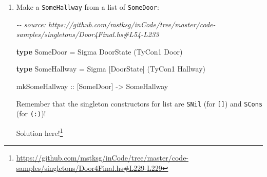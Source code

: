 \documentclass[]{article}
\newenvironment{Shaded}{}{}
\newcommand{\CommentTok}[1]{\textcolor[rgb]{0.38,0.63,0.69}{\textit{#1}}}
\newcommand{\DataTypeTok}[1]{\textcolor[rgb]{0.56,0.13,0.00}{#1}}
\newcommand{\FunctionTok}[1]{\textcolor[rgb]{0.02,0.16,0.49}{#1}}
\newcommand{\KeywordTok}[1]{\textcolor[rgb]{0.00,0.44,0.13}{\textbf{#1}}}
\newcommand{\NormalTok}[1]{#1}
\newcommand{\OperatorTok}[1]{\textcolor[rgb]{0.40,0.40,0.40}{#1}}
\newcommand{\OtherTok}[1]{\textcolor[rgb]{0.00,0.44,0.13}{#1}}
\renewcommand{\href}[2]{#2\footnote{\url{#1}}}
\begin{document}
\begin{enumerate}
\begin{Shaded}
\begin{Highlighting}[]
\FunctionTok{map}\OtherTok{ ::}\NormalTok{ (a }\OtherTok{{-}>}\NormalTok{ b) }\OtherTok{{-}>}\NormalTok{ [a] \_}\OperatorTok{>}\NormalTok{ [b]}
\FunctionTok{map}\NormalTok{ f }\OtherTok{=} \FunctionTok{foldr}\NormalTok{ ((}\OperatorTok{:}\NormalTok{) }\OperatorTok{.}\NormalTok{ f) []}
\end{Highlighting}
\end{Shaded}

  Let's do the same thing at the type level, manually.

  Directly implement a type-level \texttt{Map}, with kind
  \texttt{(j\ \textasciitilde{}\textgreater{}\ k)\ -\textgreater{}\ {[}j{]}\ -\textgreater{}\ {[}k{]}},
  in terms of \texttt{Foldr}:

\begin{Shaded}
\begin{Highlighting}[]
\KeywordTok{type} \DataTypeTok{Map}\NormalTok{ f xs }\OtherTok{=} \DataTypeTok{Foldr} \OperatorTok{????} \OperatorTok{????}\NormalTok{ xs}
\end{Highlighting}
\end{Shaded}

  Try to mirror the value-level definition, passing in \texttt{(:)\ .\ f}, and
  use the promoted version of \texttt{(.)} from the \emph{singletons} library,
  in
  \emph{\href{http://hackage.haskell.org/package/singletons-2.5/docs/Data-Singletons-Prelude.html}{Data.Singletons.Prelude}}.
  You might find \texttt{TyCon2} helpful!

  \href{https://github.com/mstksg/inCode/tree/master/code-samples/singletons/Door4Final.hs\#L229-L229}{Solution
  here!}
\item
  Make a \texttt{SomeHallway} from a list of \texttt{SomeDoor}:

\begin{Shaded}
\begin{Highlighting}[]
\CommentTok{{-}{-} source: https://github.com/mstksg/inCode/tree/master/code{-}samples/singletons/Door4Final.hs\#L54{-}L233}

\KeywordTok{type} \DataTypeTok{SomeDoor} \OtherTok{=} \DataTypeTok{Sigma} \DataTypeTok{DoorState}\NormalTok{ (}\DataTypeTok{TyCon1} \DataTypeTok{Door}\NormalTok{)}

\KeywordTok{type} \DataTypeTok{SomeHallway} \OtherTok{=} \DataTypeTok{Sigma}\NormalTok{ [}\DataTypeTok{DoorState}\NormalTok{] (}\DataTypeTok{TyCon1} \DataTypeTok{Hallway}\NormalTok{)}

\OtherTok{mkSomeHallway ::}\NormalTok{ [}\DataTypeTok{SomeDoor}\NormalTok{] }\OtherTok{{-}>} \DataTypeTok{SomeHallway}
\end{Highlighting}
\end{Shaded}

  Remember that the singleton constructors for list are \texttt{SNil} (for
  \texttt{{[}{]}}) and \texttt{SCons} (for \texttt{(:)})!

  \href{https://github.com/mstksg/inCode/tree/master/code-samples/singletons/Door4Final.hs\#L229-L229}{Solution
  here!}
\end{enumerate}
\end{document}
